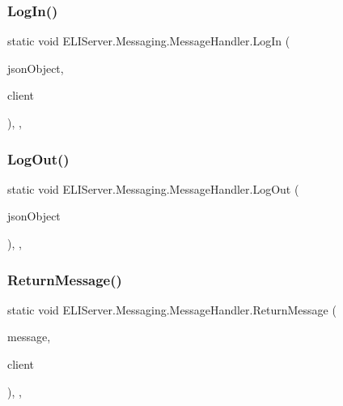 \subsubsection{\texorpdfstring{Log\+In()}{LogIn()}}
{\footnotesize\ttfamily static void E\+L\+I\+Server.\+Messaging.\+Message\+Handler.\+Log\+In (\begin{DoxyParamCaption}\item[{dynamic}]{json\+Object,  }\item[{\hyperlink{class_e_l_i_server_1_1_messaging_1_1_client_message_socket}{Client\+Message\+Socket}}]{client }\end{DoxyParamCaption})\hspace{0.3cm}{\ttfamily [inline]}, {\ttfamily [static]}, {\ttfamily [private]}}

\mbox{\label{class_e_l_i_server_1_1_messaging_1_1_message_handler_a1fe43aa94ee3e3d03fcf147549eabced}} 
\subsubsection{\texorpdfstring{Log\+Out()}{LogOut()}}
{\footnotesize\ttfamily static void E\+L\+I\+Server.\+Messaging.\+Message\+Handler.\+Log\+Out (\begin{DoxyParamCaption}\item[{dynamic}]{json\+Object }\end{DoxyParamCaption})\hspace{0.3cm}{\ttfamily [inline]}, {\ttfamily [static]}, {\ttfamily [private]}}

\mbox{\label{class_e_l_i_server_1_1_messaging_1_1_message_handler_a5340630c241299aa12547888d42edd03}} 
\subsubsection{\texorpdfstring{Return\+Message()}{ReturnMessage()}}
{\footnotesize\ttfamily static void E\+L\+I\+Server.\+Messaging.\+Message\+Handler.\+Return\+Message (\begin{DoxyParamCaption}\item[{string}]{message,  }\item[{\hyperlink{class_e_l_i_server_1_1_messaging_1_1_client_message_socket}{Client\+Message\+Socket}}]{client }\end{DoxyParamCaption})\hspace{0.3cm}{\ttfamily [inline]}, {\ttfamily [static]}, {\ttfamily [private]}}



